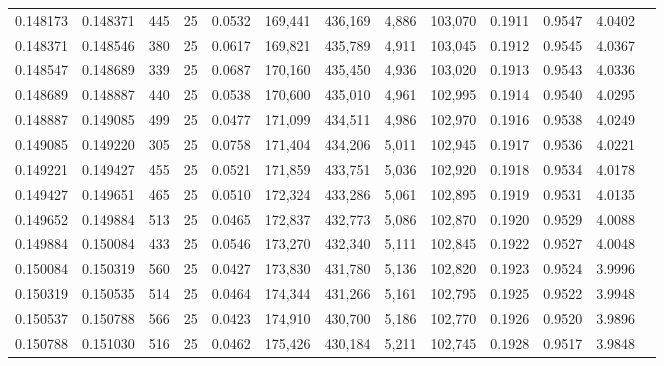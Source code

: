 \begin{tabular}{rrrrrrrrrrrrr}
0.148173 & 0.148371 &   445 &  25 &                                     0.0532 & 169,441 & 436,169 &   4,886 & 103,070 & 0.1911 & 0.9547 & 4.0402 \\
0.148371 & 0.148546 &   380 &  25 &                                     0.0617 & 169,821 & 435,789 &   4,911 & 103,045 & 0.1912 & 0.9545 & 4.0367 \\
0.148547 & 0.148689 &   339 &  25 &                                     0.0687 & 170,160 & 435,450 &   4,936 & 103,020 & 0.1913 & 0.9543 & 4.0336 \\
0.148689 & 0.148887 &   440 &  25 &                                     0.0538 & 170,600 & 435,010 &   4,961 & 102,995 & 0.1914 & 0.9540 & 4.0295 \\
0.148887 & 0.149085 &   499 &  25 &                                     0.0477 & 171,099 & 434,511 &   4,986 & 102,970 & 0.1916 & 0.9538 & 4.0249 \\
0.149085 & 0.149220 &   305 &  25 &                                     0.0758 & 171,404 & 434,206 &   5,011 & 102,945 & 0.1917 & 0.9536 & 4.0221 \\
0.149221 & 0.149427 &   455 &  25 &                                     0.0521 & 171,859 & 433,751 &   5,036 & 102,920 & 0.1918 & 0.9534 & 4.0178 \\
0.149427 & 0.149651 &   465 &  25 &                                     0.0510 & 172,324 & 433,286 &   5,061 & 102,895 & 0.1919 & 0.9531 & 4.0135 \\
0.149652 & 0.149884 &   513 &  25 &                                     0.0465 & 172,837 & 432,773 &   5,086 & 102,870 & 0.1920 & 0.9529 & 4.0088 \\
0.149884 & 0.150084 &   433 &  25 &                                     0.0546 & 173,270 & 432,340 &   5,111 & 102,845 & 0.1922 & 0.9527 & 4.0048 \\
0.150084 & 0.150319 &   560 &  25 &                                     0.0427 & 173,830 & 431,780 &   5,136 & 102,820 & 0.1923 & 0.9524 & 3.9996 \\
0.150319 & 0.150535 &   514 &  25 &                                     0.0464 & 174,344 & 431,266 &   5,161 & 102,795 & 0.1925 & 0.9522 & 3.9948 \\
0.150537 & 0.150788 &   566 &  25 &                                     0.0423 & 174,910 & 430,700 &   5,186 & 102,770 & 0.1926 & 0.9520 & 3.9896 \\
0.150788 & 0.151030 &   516 &  25 &                                     0.0462 & 175,426 & 430,184 &   5,211 & 102,745 & 0.1928 & 0.9517 & 3.9848 \\

\end{tabular}
